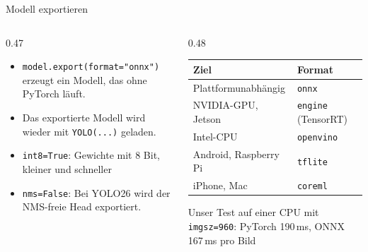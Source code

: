 \begin{frame}{Modell exportieren}
\footnotesize
\begin{columns}
\begin{column}{0.47\textwidth}
\begin{itemize}
  \item \texttt{model.export(format="onnx")} erzeugt ein Modell, das ohne PyTorch läuft.
  \item Das exportierte Modell wird wieder mit \texttt{YOLO(...)} geladen.
  \item \texttt{int8=True}: Gewichte mit 8 Bit, kleiner und schneller
  \item \texttt{nms=False}: Bei YOLO26 wird der NMS-freie Head exportiert.
\end{itemize}
\end{column}
\begin{column}{0.48\textwidth}
\centering
\begin{tabular}{ll}
\toprule
\textbf{Ziel} & \textbf{Format} \\
\midrule
Plattformunabhängig & \texttt{onnx} \\
NVIDIA-GPU, Jetson & \texttt{engine} (TensorRT) \\
Intel-CPU & \texttt{openvino} \\
Android, Raspberry Pi & \texttt{tflite} \\
iPhone, Mac & \texttt{coreml} \\
\bottomrule
\end{tabular}

\vspace{0.8em}
Unser Test auf einer CPU mit \texttt{imgsz=960}: PyTorch 190\,ms, ONNX 167\,ms pro Bild
\end{column}
\end{columns}
\end{frame}

